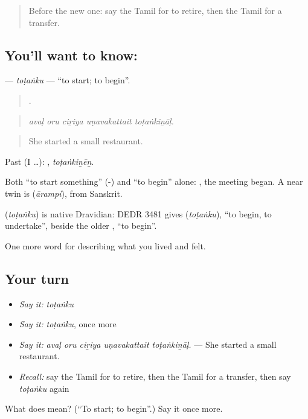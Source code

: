 \begin{quote}
Before the new one: say the Tamil for to retire, then the Tamil for a transfer.
\end{quote}

\subsection*{You'll want to know: }
\textbf{} — \emph{toṭaṅku} — \textquotedblleft{}to start; to begin\textquotedblright{}.

\begin{quote}
    .
\end{quote}

\begin{quote}
\emph{avaḷ oru ciṟiya uṇavakattait toṭaṅkiṉāḷ.}
\end{quote}

\begin{quote}
She started a small restaurant.
\end{quote}

Past (I …): , \emph{toṭaṅkiṉēṉ}.

Both \textquotedblleft{}to start something\textquotedblright{} (-) and \textquotedblleft{}to begin\textquotedblright{} alone:  , the meeting began. A near twin is  (\emph{ārampi}), from Sanskrit.

\begin{cousinweb}
\textbf{} (\emph{toṭaṅku}) is native Dravidian: DEDR 3481 gives  (\emph{toṭaṅku}), \textquotedblleft{}to begin, to undertake\textquotedblright{}, beside the older , \textquotedblleft{}to begin\textquotedblright{}.
\end{cousinweb}

\begin{grammarlens}[title={What you've built}]
One more word for describing what you lived and felt.
\end{grammarlens}

\subsection*{Your turn}
\begin{itemize}
\raggedright
  \item \emph{Say it:} \emph{toṭaṅku}
  \item \emph{Say it:} \emph{toṭaṅku}, once more
  \item \emph{Say it:} \emph{avaḷ oru ciṟiya uṇavakattait toṭaṅkiṉāḷ.} — She started a small restaurant.
  \item \emph{Recall:} say the Tamil for to retire, then the Tamil for a transfer, then say \emph{toṭaṅku} again
\end{itemize}

\begin{tcolorbox}[breakable,colback=teal!4,colframe=teal!35!black,title={Before you move on}]
What does  mean? (\textquotedblleft{}To start; to begin\textquotedblright{}.) Say it once more.
\end{tcolorbox}
